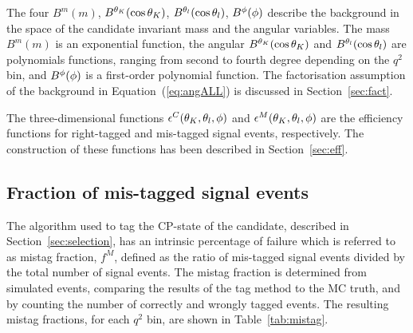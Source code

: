 The four \pdfs $B^m(m)$, $B^{\theta_K}(\cos\theta_K)$, $B^{\theta_l}(\cos\theta_l)$, $B^{\phi}(\phi)$ describe the background in the space of the \PBz candidate invariant mass and the angular variables.
The mass \pdf $B^m(m)$ is an exponential function, the angular \pdfs $B^{\theta_K}(\cos\theta_K)$ and $B^{\theta_l}(\cos\theta_l)$ are polynomials functions, ranging from second to fourth degree depending on the $q^2$ bin, and $B^{\phi}(\phi)$ is a first-order polynomial function.
The factorisation assumption of the background \pdf in Equation~(\ref{eq:angALL}) is discussed in Section~\ref{sec:fact}.

The three-dimensional functions $\epsilon^{C}(\theta_K,\theta_l,\phi)$ and $\epsilon^{M}(\theta_K,\theta_l,\phi)$ are the efficiency functions for right-tagged and mis-tagged signal events, respectively.
The construction of these functions has been described in Section~\ref{sec:eff}.

\subsection{Fraction of mis-tagged signal events}
\label{sec:mistag}


The algorithm used to tag the CP-state of the \PBz candidate, described in Section~\ref{sec:selection}, has an intrinsic percentage of failure which is referred to as mistag fraction, $f^M$, defined as the ratio of mis-tagged signal events divided by the total number of signal events.
The mistag fraction is determined from simulated events, comparing the results of the tag method to the MC truth, and by counting the number of correctly and wrongly tagged events.
The resulting mistag fractions, for each $q^2$ bin, are shown in Table~\ref{tab:mistag}.

